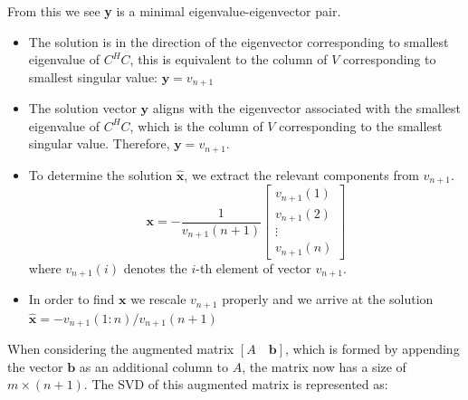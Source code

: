 From this we see \textbf{y} is a minimal eigenvalue-eigenvector pair.





\begin{itemize}
    \item The solution is in the direction of the eigenvector corresponding to smallest eigenvalue of \(C^H C\), this is equivalent to the column of \(V\) corresponding to smallest singular value: \(\mathbf{y} = v_{n+1}\)
    \item The solution vector \( \textbf{y} \) aligns with the eigenvector associated with the smallest eigenvalue of \( C^H C \), which is the column of \( V \) corresponding to the smallest singular value. Therefore, \( \textbf{y} = v_{n+1} \).
    \item To determine the solution \( \hat{\textbf{x}} \), we extract the relevant components from \( v_{n+1} \).
    \begin{equation}
        \bm{x} = -\frac{1}{v_{n+1}(n+1)} 
        \begin{bmatrix}
            v_{n+1}(1) \\
            v_{n+1}(2) \\
            \vdots \\
            v_{n+1}(n)
        \end{bmatrix}
    \end{equation}
    where \( v_{n+1}(i) \) denotes the \( i \)-th element of vector \( v_{n+1} \).
        \item In order to find \( \mathbf{x} \) we rescale \( v_{n+1} \) properly and we arrive at the solution \(\mathbf{\hat{x}} = -v_{n+1}(1:n)/v_{n+1}(n + 1)\)

\end{itemize}
When considering the augmented matrix \( [A \quad \mathbf{b}] \), which is formed by appending the vector \( \mathbf{b} \) as an additional column to \( A \), the matrix now has a size of \( m \times (n+1) \). The SVD of this augmented matrix is represented as:

